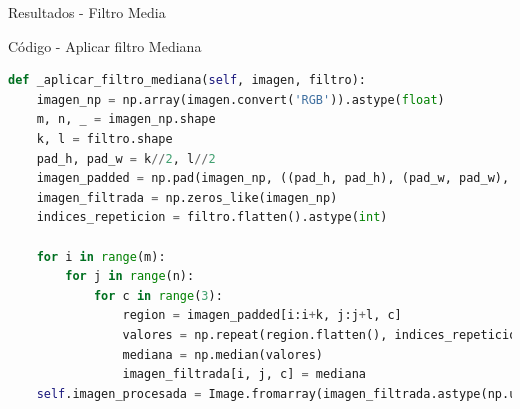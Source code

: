 \documentclass{beamer}
\begin{document}
\begin{frame}[fragile]{Resultados - Filtro Media}
\begin{minipage}{0.45\linewidth}
		\label{fig:lenaej10a}
	\end{minipage}
\end{frame}

\begin{frame}[fragile]{Código - Aplicar filtro Mediana}
	\justifying
	
	\begin{lstlisting}[language=Python]
def _aplicar_filtro_mediana(self, imagen, filtro):
	imagen_np = np.array(imagen.convert('RGB')).astype(float)
	m, n, _ = imagen_np.shape
	k, l = filtro.shape
	pad_h, pad_w = k//2, l//2
	imagen_padded = np.pad(imagen_np, ((pad_h, pad_h), (pad_w, pad_w), (0, 0)), mode='constant')
	imagen_filtrada = np.zeros_like(imagen_np)
	indices_repeticion = filtro.flatten().astype(int)
	
	for i in range(m):
		for j in range(n):
			for c in range(3):
				region = imagen_padded[i:i+k, j:j+l, c]
				valores = np.repeat(region.flatten(), indices_repeticion) # Indica rep de cada indice
				mediana = np.median(valores)
				imagen_filtrada[i, j, c] = mediana
	self.imagen_procesada = Image.fromarray(imagen_filtrada.astype(np.uint8))
	\end{lstlisting}
\end{frame}
\end{document}
